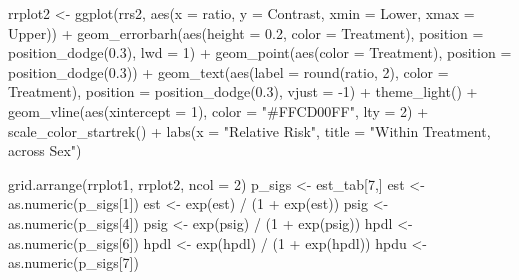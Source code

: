 \documentclass[12pt]{article}
\newenvironment{Shaded}{\begin{snugshade}}{\end{snugshade}}
\newcommand{\AttributeTok}[1]{\textcolor[rgb]{0.77,0.63,0.00}{#1}}
\newcommand{\DecValTok}[1]{\textcolor[rgb]{0.00,0.00,0.81}{#1}}
\newcommand{\FloatTok}[1]{\textcolor[rgb]{0.00,0.00,0.81}{#1}}
\newcommand{\FunctionTok}[1]{\textcolor[rgb]{0.00,0.00,0.00}{#1}}
\newcommand{\NormalTok}[1]{#1}
\newcommand{\OtherTok}[1]{\textcolor[rgb]{0.56,0.35,0.01}{#1}}
\newcommand{\SpecialCharTok}[1]{\textcolor[rgb]{0.00,0.00,0.00}{#1}}
\newcommand{\StringTok}[1]{\textcolor[rgb]{0.31,0.60,0.02}{#1}}
\begin{document}
\begin{Shaded}
\begin{Highlighting}[]
\NormalTok{rrplot2 }\OtherTok{\textless{}{-}} \FunctionTok{ggplot}\NormalTok{(rrs2, }\FunctionTok{aes}\NormalTok{(}\AttributeTok{x =}\NormalTok{ ratio, }\AttributeTok{y =}\NormalTok{ Contrast, }\AttributeTok{xmin =}\NormalTok{ Lower, }\AttributeTok{xmax =}\NormalTok{ Upper)) }\SpecialCharTok{+}
  \FunctionTok{geom\_errorbarh}\NormalTok{(}\FunctionTok{aes}\NormalTok{(}\AttributeTok{height =} \FloatTok{0.2}\NormalTok{, }\AttributeTok{color =}\NormalTok{ Treatment),}
                 \AttributeTok{position =} \FunctionTok{position\_dodge}\NormalTok{(}\FloatTok{0.3}\NormalTok{), }\AttributeTok{lwd =} \DecValTok{1}\NormalTok{) }\SpecialCharTok{+}
  \FunctionTok{geom\_point}\NormalTok{(}\FunctionTok{aes}\NormalTok{(}\AttributeTok{color =}\NormalTok{ Treatment), }\AttributeTok{position =} \FunctionTok{position\_dodge}\NormalTok{(}\FloatTok{0.3}\NormalTok{)) }\SpecialCharTok{+}
  \FunctionTok{geom\_text}\NormalTok{(}\FunctionTok{aes}\NormalTok{(}\AttributeTok{label =} \FunctionTok{round}\NormalTok{(ratio, }\DecValTok{2}\NormalTok{), }\AttributeTok{color =}\NormalTok{ Treatment), }
            \AttributeTok{position =} \FunctionTok{position\_dodge}\NormalTok{(}\FloatTok{0.3}\NormalTok{), }\AttributeTok{vjust =} \SpecialCharTok{{-}}\DecValTok{1}\NormalTok{) }\SpecialCharTok{+}
  \FunctionTok{theme\_light}\NormalTok{() }\SpecialCharTok{+}
  \FunctionTok{geom\_vline}\NormalTok{(}\FunctionTok{aes}\NormalTok{(}\AttributeTok{xintercept =} \DecValTok{1}\NormalTok{), }\AttributeTok{color =} \StringTok{"\#FFCD00FF"}\NormalTok{, }\AttributeTok{lty =} \DecValTok{2}\NormalTok{) }\SpecialCharTok{+}
  \FunctionTok{scale\_color\_startrek}\NormalTok{() }\SpecialCharTok{+}
  \FunctionTok{labs}\NormalTok{(}\AttributeTok{x =} \StringTok{"Relative Risk"}\NormalTok{, }\AttributeTok{title =} \StringTok{"Within Treatment, across Sex"}\NormalTok{)}

\FunctionTok{grid.arrange}\NormalTok{(rrplot1, rrplot2, }\AttributeTok{ncol =} \DecValTok{2}\NormalTok{)}
\NormalTok{p\_sigs }\OtherTok{\textless{}{-}}\NormalTok{ est\_tab[}\DecValTok{7}\NormalTok{,]}
\NormalTok{est }\OtherTok{\textless{}{-}} \FunctionTok{as.numeric}\NormalTok{(p\_sigs[}\DecValTok{1}\NormalTok{])}
\NormalTok{est }\OtherTok{\textless{}{-}} \FunctionTok{exp}\NormalTok{(est) }\SpecialCharTok{/}\NormalTok{ (}\DecValTok{1} \SpecialCharTok{+} \FunctionTok{exp}\NormalTok{(est))}
\NormalTok{psig }\OtherTok{\textless{}{-}} \FunctionTok{as.numeric}\NormalTok{(p\_sigs[}\DecValTok{4}\NormalTok{])}
\NormalTok{psig }\OtherTok{\textless{}{-}} \FunctionTok{exp}\NormalTok{(psig) }\SpecialCharTok{/}\NormalTok{ (}\DecValTok{1} \SpecialCharTok{+} \FunctionTok{exp}\NormalTok{(psig))}
\NormalTok{hpdl }\OtherTok{\textless{}{-}} \FunctionTok{as.numeric}\NormalTok{(p\_sigs[}\DecValTok{6}\NormalTok{])}
\NormalTok{hpdl }\OtherTok{\textless{}{-}} \FunctionTok{exp}\NormalTok{(hpdl) }\SpecialCharTok{/}\NormalTok{ (}\DecValTok{1} \SpecialCharTok{+} \FunctionTok{exp}\NormalTok{(hpdl))}
\NormalTok{hpdu }\OtherTok{\textless{}{-}} \FunctionTok{as.numeric}\NormalTok{(p\_sigs[}\DecValTok{7}\NormalTok{])}


\end{Highlighting}
\end{Shaded}
\end{document}
